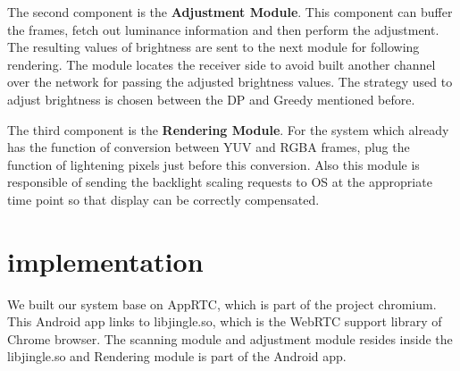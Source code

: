 The second component is the {\bf Adjustment Module}. This component
can buffer the frames, fetch out luminance information and then
perform the adjustment. The resulting values of brightness are sent to
the next module for following rendering. The module locates the
receiver side to avoid built another channel over the network for
passing the adjusted brightness values. The strategy used to adjust
brightness is chosen between the DP and Greedy mentioned before.


The third component is the {\bf Rendering Module}. For the system which
already has the function of conversion between YUV and RGBA frames,
plug the function of lightening pixels just before this
conversion. Also this module is responsible of sending the backlight
scaling requests to OS at the appropriate time point so that display
can be correctly compensated. 


\section{implementation}
\label{sec:implementation}

We built our system base on AppRTC, which is part of the project
chromium. This Android app links to libjingle.so, which is the WebRTC
support library of Chrome browser. The scanning module and adjustment
module resides inside the libjingle.so and Rendering module is part of
the Android app.



